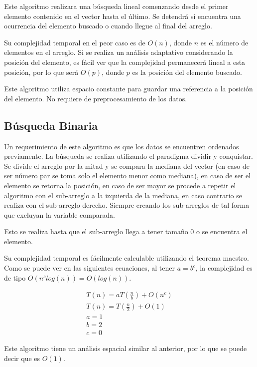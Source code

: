 \documentclass[]{article}
\begin{document}
Este algoritmo realizara una búsqueda lineal comenzando desde el primer elemento contenido en el vector hasta el último. Se detendrá si encuentra una ocurrencia del elemento buscado o cuando llegue al final del arreglo.

Su complejidad temporal en el peor caso es de $O(n)$, donde $n$ es el número de elementos en el arreglo. Si se realiza un análisis adaptativo considerando la posición del elemento, es fácil ver que la complejidad permanecerá lineal a esta posición, por lo que será $O(p)$, donde $p$ es la posición del elemento buscado.

Este algoritmo utiliza espacio constante para guardar una referencia a la posición del elemento. No requiere de preprocesamiento de los datos.

\subsection{Búsqueda Binaria}

Un requerimiento de este algoritmo es que los datos se encuentren ordenados previamente. La búsqueda se realiza utilizando el paradigma dividir y conquistar. Se divide el arreglo por la mitad y se compara la mediana del vector (en caso de ser número par se toma solo el elemento menor como mediana), en caso de ser el elemento se retorna la posición, en caso de ser mayor se procede a repetir el algoritmo con el sub-arreglo a la izquierda de la mediana, en caso contrario se realiza con el sub-arreglo derecho. Siempre creando los sub-arreglos de tal forma que excluyan la variable comparada.

Esto se realiza hasta que el sub-arreglo llega a tener tamaño 0 o se encuentra el elemento.

Su complejidad temporal es fácilmente calculable utilizando el teorema maestro. Como se puede ver en las siguientes ecuaciones, al tener $a=b^{c}$, la complejidad es de tipo $O(n^{c}log(n)) = O(log(n))$.

\begin{align*}
	T(n) = aT(\frac{n}{b}) + O(n^{c}) \\
	T(n) = T(\frac{n}{2}) + O(1) \\
	a = 1 \\
	b = 2 \\
	c = 0
\end{align*}

Este algoritmo tiene un análisis espacial similar al anterior, por lo que se puede decir que es $O(1)$.
\end{document}

